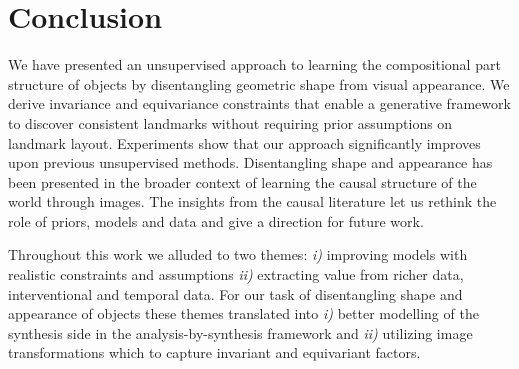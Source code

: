

\chapter{Conclusion}



	We have presented an unsupervised approach to learning the compositional part structure of objects by disentangling geometric shape from visual appearance. We derive invariance and equivariance constraints that enable a generative framework to discover consistent landmarks without requiring prior assumptions on landmark layout. Experiments show that our approach significantly improves upon previous unsupervised methods.
	Disentangling shape and appearance has been presented in the broader context of learning the causal structure of the world through images. The insights from the causal literature let us rethink the role of priors, models and data and give a direction for future work.

	Throughout this work we alluded to two themes: \emph{i)} improving models with realistic constraints and assumptions \emph{ii)} extracting value from richer data, \ie interventional and temporal data.
	For our task of disentangling shape and appearance of objects these themes translated into \emph{i)} better modelling of the synthesis side in the analysis-by-synthesis framework and \emph{ii)} utilizing image transformations \wrt which to capture invariant and equivariant factors.


